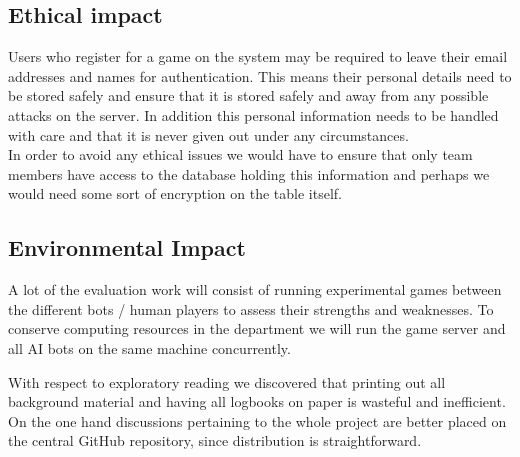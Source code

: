 \documentclass[12pt]{article}
\begin{document}
\subsection{Ethical impact}

Users who register for a game on the system may be required to leave
their email addresses and names for authentication. This means their
personal details need to be stored safely and ensure that it is stored
safely and away from any possible attacks on the server. In addition
this personal information needs to be handled with care and that it
is never given out under any circumstances.\\
In order to avoid any ethical issues we would have to ensure that
only team members have access to the database holding this information
and perhaps we would need some sort of encryption on the table itself.

\subsection{Environmental Impact }

A lot of the evaluation work will consist of running experimental
games between the different bots / human players to assess their 
strengths and weaknesses. To conserve computing resources in the 
department we will run the game server and all AI bots on the same
machine concurrently. 

With respect to exploratory reading we discovered that printing
out all background material and having all logbooks on paper is wasteful
and inefficient. On the one hand discussions pertaining to the
whole project are better placed on the central GitHub repository, since 
distribution is straightforward. 

\end{document}
